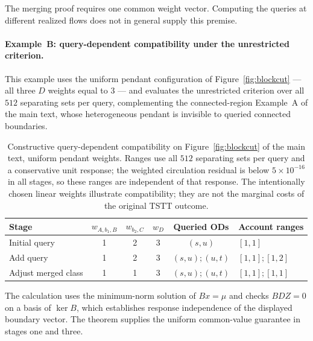 \begin{rmk}\label{rmk:quantifier}
The merging proof requires one common weight vector. Computing the
queries at different realized flows does not in general supply this
premise.
\end{rmk}

\paragraph{Example~B: query-dependent compatibility under the
unrestricted criterion.}
This example uses the uniform pendant configuration of
Figure~\ref{fig:blockcut} --- all three $D$ weights equal to $3$ ---
and evaluates the unrestricted criterion over all $512$ separating sets
per query, complementing the connected-region Example~A of the main
text, whose heterogeneous pendant is invisible to queried connected
boundaries.
\begin{table}[pos=tb]
\footnotesize
\caption{Constructive query-dependent compatibility on Figure~\ref{fig:blockcut}
of the main text, uniform pendant weights. Ranges use all $512$
separating sets per query and a
conservative unit response; the weighted circulation residual is below
$5\times10^{-16}$ in all stages, so these ranges are independent of that
response. The intentionally chosen linear weights illustrate
compatibility; they are not the marginal costs of the original TSTT
outcome.}\label{tab:topologyexample}
\begin{tabular*}{\tblwidth}{@{\extracolsep{\fill}}lccccl}
\toprule Stage & $w_{A,b_1,B}$ & $w_{b_2,C}$ & $w_D$ & Queried ODs & Account ranges\\\midrule
Initial query & 1 & 2 & 3 & $(s,u)$ & $[1,1]$\\
Add query & 1 & 2 & 3 & $(s,u);(u,t)$ & $[1,1];[1,2]$\\
Adjust merged class & 1 & 1 & 3 & $(s,u);(u,t)$ & $[1,1];[1,1]$\\
\bottomrule\end{tabular*}\end{table}
The calculation uses the minimum-norm solution of $Bx=\mu$ and checks
$BDZ=0$ on a basis of $\ker B$, which establishes response independence
of the displayed boundary vector. The theorem supplies the uniform
common-value guarantee in stages one and three.


